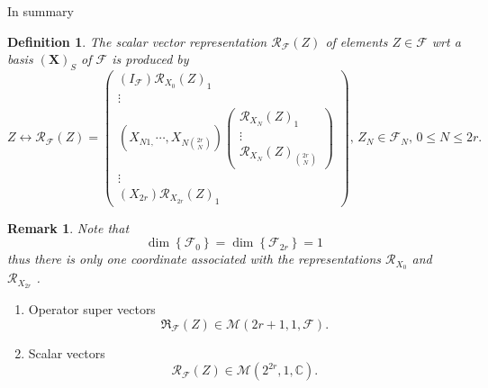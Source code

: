 \documentclass[aps,preprint]{revtex4}
\newtheorem{definition}[theorem]{Definition}
\newtheorem{remark}[theorem]{Remark}
\begin{document}
In summary

\begin{definition}
The scalar vector representation $\mathcal{R}_{\mathcal{F}}\left( Z\right) $
of elements $Z\in \mathcal{F}$ wrt a basis $\left( \boldsymbol{X}\right)
_{S} $ of $\mathcal{F}$ is produced by 
\begin{equation}
Z\leftrightarrow \mathcal{R}_{\mathcal{F}}\left( Z\right) =\left( 
\begin{array}{c}
\left( I_{\mathcal{F}}\right) \mathcal{R}_{X_{0}}\left( Z\right) _{1} \\ 
\vdots \\ 
\left( X_{N1,}\cdots ,X_{N\binom{2r}{N}}\right) \left( 
\begin{array}{c}
\mathcal{R}_{X_{N}}\left( Z\right) _{1} \\ 
\vdots \\ 
\mathcal{R}_{X_{N}}\left( Z\right) _{\binom{2r}{N}}%
\end{array}%
\right) \\ 
\vdots \\ 
\left( X_{2r}\right) \mathcal{R}_{X_{2r}}\left( Z\right) _{1}%
\end{array}%
\right) ,\,Z_{N}\in \mathcal{F}_{N},\,0\leq N\leq 2r.
\end{equation}
\end{definition}

\begin{remark}
Note that 
\begin{equation}
\dim \left\{ \mathcal{F}_{0}\right\} =\dim \left\{ \mathcal{F}_{2r}\right\}
=1
\end{equation}%
thus there is only one coordinate associated with the representations $%
\mathcal{R}_{X_{0}}$ and $\mathcal{R}_{X_{2r}}$ .
\end{remark}

\begin{enumerate}
\item Operator super vectors 
\begin{equation}
\mathfrak{R}_{\mathcal{F}}\left( Z\right) \in \mathcal{M}\left( 2r+1,1,%
\mathcal{F}\right) .
\end{equation}

\item Scalar vectors 
\begin{equation}
\mathcal{R}_{\mathcal{F}}\left( Z\right) \in \mathcal{M}\left( 2^{2r},1,%
\mathbb{C}\right) .
\end{equation}
\end{enumerate}
\end{document}
